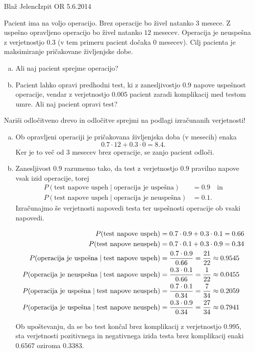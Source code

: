 \begin{naloga}{Blaž Jelenc}{Izpit OR 5.6.2014}
\begin{vprasanje}
Pacient ima na voljo operacijo.
Brez operacije bo živel natanko $3$ mesece.
Z uspeš\-no opravljeno operacijo bo živel natanko $12$ mesecev.
Operacija je neuspešna z verjetnostjo $0.3$
(v tem primeru pacient dočaka $0$ mesecev).
Cilj pacienta je maksimiranje pričakovane življenjske dobe.
\begin{enumerate}[(a)]
\item Ali naj pacient sprejme operacijo?
\item Pacient lahko opravi predhodni test,
ki z zanesljivostjo $0.9$ napove uspeš\-nost operacije,
vendar z verjetnostjo $0.005$ pacient zaradi komplikacij med testom umre.
Ali naj pacient opravi test?
\end{enumerate}
Nariši odločitveno drevo
in odločitve sprejmi na podlagi izračunanih ve\-rjet\-no\-sti!
\end{vprasanje}

\begin{odgovor}
\begin{enumerate}[(a)]
\item Ob opravljeni operaciji
je pričakovana življenjska doba (v mesecih) enaka
$$
0.7 \cdot 12 + 0.3 \cdot 0 = 8.4 .
$$
Ker je to več od $3$ mesecev brez operacije, se zanjo pacient odloči.

\item Zanesljivost $0.9$ razumemo tako,
da test z verjetnostjo $0.9$ pravilno napove vsak izid operacije,
torej
\begin{align*}
P(\text{test napove uspeh} \;|\; \text{operacija je uspešna}) &= 0.9
\quad \text{in} \\
P(\text{test napove uspeh} \;|\; \text{operacija je neuspešna}) &= 0.1 .
\end{align*}
Izračunajmo še verjetnosti napovedi testa
ter uspešnosti operacije ob vsaki napovedi.
\begin{small}
\begin{align*}
P(\text{test napove uspeh}) &= 0.7 \cdot 0.9 + 0.3 \cdot 0.1 = 0.66 \\
P(\text{test napove neuspeh}) &= 0.7 \cdot 0.1 + 0.3 \cdot 0.9 = 0.34 \\
P(\text{operacija je uspešna} \;|\; \text{test napove uspeh})
&= {0.7 \cdot 0.9 \over 0.66} = {21 \over 22} \approx 0.9545 \\
P(\text{operacija je neuspešna} \;|\; \text{test napove uspeh})
&= {0.3 \cdot 0.1 \over 0.66} = {1 \over 22} \approx 0.0455 \\
P(\text{operacija je uspešna} \;|\; \text{test napove neuspeh})
&= {0.7 \cdot 0.1 \over 0.34} = {7 \over 34} \approx 0.2059 \\
P(\text{operacija je uspešna} \;|\; \text{test napove neuspeh})
&= {0.3 \cdot 0.9 \over 0.34} = {27 \over 34} \approx 0.7941
\end{align*}
\end{small}
Ob upoštevanju, da se bo test končal brez komplikacij z verjetnostjo $0.995$,
sta verjetnosti pozitivnega in negativnega izida testa brez komplikacij
enaki $0.6567$ oziroma $0.3383$.


\end{enumerate}
\end{odgovor}
\end{naloga}
